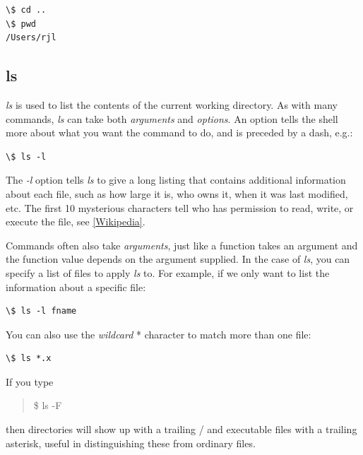 \documentclass[letterpaper,10pt,english]{sphinxmanual}
\begin{document}
\begin{Verbatim}[commandchars=\\\{\}]
\$ cd ..
\$ pwd
/Users/rjl
\end{Verbatim}


\subsection{ls}
\label{unix:ls}
\emph{ls} is used to list the contents of the current working directory.
As with many commands, \emph{ls} can take both \emph{arguments} and \emph{options}.  An
option tells the shell more about what you want the command to do, and is
preceded by a dash, e.g.:

\begin{Verbatim}[commandchars=\\\{\}]
\$ ls -l
\end{Verbatim}

The \emph{-l} option tells \emph{ls} to give a long listing that contains additional
information about each file, such as how large it is, who owns it, when it
was last modified, etc.   The first 10 mysterious characters tell who has
permission to read, write, or execute the file, see \href{http://en.wikipedia.org/wiki/File\_system\_permissions}{{[}Wikipedia{]}}.

Commands often also take \emph{arguments}, just like a function takes an argument
and the function value depends on the argument supplied.  In the case of
\emph{ls}, you can specify a list of files to apply \emph{ls} to. For example, if we
only want to list the information about a specific file:

\begin{Verbatim}[commandchars=\\\{\}]
\$ ls -l fname
\end{Verbatim}

You can also use the \emph{wildcard} * character to match more than one file:

\begin{Verbatim}[commandchars=\\\{\}]
\$ ls *.x
\end{Verbatim}

If you type
\begin{quote}

\$ ls -F
\end{quote}

then directories will show up with a trailing / and executable files with a
trailing asterisk, useful in distinguishing these from ordinary files.
\end{document}
